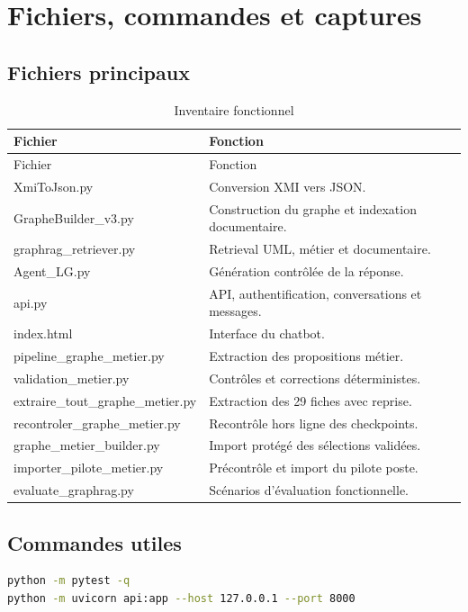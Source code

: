 \chapter{Fichiers, commandes et captures}

\section{Fichiers principaux}

\begin{longtable}{>{\ttfamily}p{}p{}}
\caption{Inventaire fonctionnel}\label{tab:fichiers}\\
\toprule
Fichier & Fonction \\
\midrule
\endfirsthead
\toprule
Fichier & Fonction \\
\midrule
\endhead
XmiToJson.py & Conversion XMI vers JSON. \\
GrapheBuilder\_v3.py & Construction du graphe et indexation documentaire. \\
graphrag\_retriever.py & Retrieval UML, métier et documentaire. \\
Agent\_LG.py & Génération contrôlée de la réponse. \\
api.py & API, authentification, conversations et messages. \\
index.html & Interface du chatbot. \\
pipeline\_graphe\_metier.py & Extraction des propositions métier. \\
validation\_metier.py & Contrôles et corrections déterministes. \\
extraire\_tout\_graphe\_metier.py & Extraction des 29 fiches avec reprise. \\
recontroler\_graphe\_metier.py & Recontrôle hors ligne des checkpoints. \\
graphe\_metier\_builder.py & Import protégé des sélections validées. \\
importer\_pilote\_metier.py & Précontrôle et import du pilote poste. \\
evaluate\_graphrag.py & Scénarios d'évaluation fonctionnelle. \\
\bottomrule
\end{longtable}

\section{Commandes utiles}

\begin{lstlisting}[language=bash,caption={Tests et lancement de l'application}]
python -m pytest -q
python -m uvicorn api:app --host 127.0.0.1 --port 8000
\end{lstlisting}

